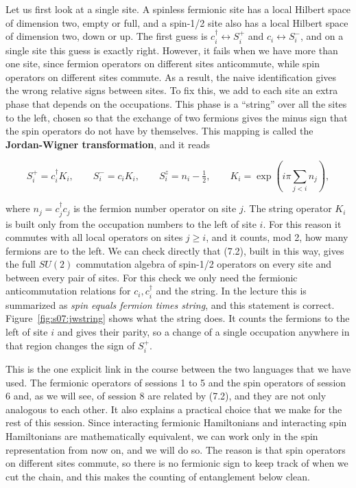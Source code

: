 Let us first look at a single site. A spinless fermionic site has a local Hilbert space of dimension
two, empty or full, and a spin-1/2 site also has a local Hilbert space of dimension two, down or up.
The first guess is $c_i^\dagger \leftrightarrow S_i^+$ and $c_i \leftrightarrow S_i^-$, and on a
single site this guess is exactly right. However, it fails when we have more than one site, since
fermion operators on different sites anticommute, while spin operators on different sites
commute. As a result, the naive identification gives
the wrong relative signs between sites. To fix this, we add to each site an extra phase that depends
on the occupations. This phase is a ``string'' over all the sites to the left, chosen so that the
exchange of two fermions gives the minus sign that the spin operators do not have by themselves. This
mapping is called the \textbf{Jordan-Wigner transformation}, and it reads

\begin{equation}
S_i^+ = c_i^\dagger K_i, \qquad S_i^- = c_i K_i, \qquad S_i^z = n_i - \tfrac{1}{2}, \qquad
K_i = \exp\!\left(i\pi \sum_{j<i} n_j\right),
\end{equation}

where $n_j = c_j^\dagger c_j$ is the fermion number operator on site $j$. The string operator $K_i$
is built only from the occupation numbers to the left of site $i$. For this reason it commutes with
all local operators on sites $j \ge i$, and it counts, mod 2, how many fermions are to the left. We
can check directly that (7.2), built in this way, gives the full $SU(2)$ commutation algebra of
spin-1/2 operators on every site and between every pair of sites. For this check we only need the
fermionic anticommutation relations for $c_i,
c_i^\dagger$ and the string. In the lecture this is summarized as \emph{spin equals fermion times
string}, and this statement is correct. Figure~\ref{fig:s07:jwstring} shows what the string does. It
counts the fermions to the left of site $i$ and gives their parity, so a change of a single occupation
anywhere in that region changes the sign of $S_i^+$.



This is the one explicit link in the course between the two languages that we have used. The
fermionic operators of sessions 1 to 5 and the spin operators of session 6 and, as we will see, of
session 8 are related by (7.2), and they are not only analogous to each other. It also explains a
practical choice that we make for the rest of this session. Since interacting fermionic Hamiltonians
and interacting spin Hamiltonians are mathematically equivalent, we can work only in the spin
representation from now on, and we will do so. The reason is that spin operators on different sites
commute, so there is no fermionic sign to keep track of when we cut the chain, and this makes the
counting of entanglement below clean.

